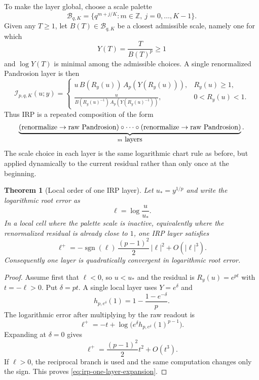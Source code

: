 \documentclass[10pt,a4paper]{article}
\theoremstyle{plain}
\newtheorem{theorem}{Theorem}[section]
\theoremstyle{definition}
\theoremstyle{remark}
\begin{document}
To make the layer global, choose a scale palette
\[
  \mathcal B_{q,K}=\{q^{m+j/K}:m\in\mathbb Z,\ j=0,\ldots,K-1\}.
\]
Given any $T\ge1$, let $B(T)\in\mathcal B_{q,K}$ be a closest admissible scale,
namely one for which
\[
  Y(T)=\frac{T}{B(T)^p}\ge1
\]
and $\log Y(T)$ is minimal among the admissible choices.  A single
renormalized Pandrosion layer is then
\begin{equation}
  \mathcal I_{p,q,K}(u;y)=
  \begin{cases}
    u\,B(R_y(u))\,A_p(Y(R_y(u))), & R_y(u)\ge1,\\[0.4em]
    \displaystyle \frac{u}{B(R_y(u)^{-1})\,A_p(Y(R_y(u)^{-1}))}, & 0<R_y(u)<1.
  \end{cases}
  \label{eq:irp-layer}
\end{equation}
Thus IRP is a repeated composition of the form
\[
  \underbrace{(\hbox{renormalize}\to\hbox{raw Pandrosion})\circ\cdots\circ
  (\hbox{renormalize}\to\hbox{raw Pandrosion})}_{m\ \hbox{layers}}.
\]
The scale choice in each layer is the same logarithmic chart rule as before,
but applied dynamically to the current residual rather than only once at the
beginning.

\begin{theorem}[Local order of one IRP layer]
\label{thm:irp-one-layer}
Let $u_*=y^{1/p}$ and write the logarithmic root error as
\[
  \ell=\log\frac{u}{u_*}.
\]
In a local cell where the palette scale is inactive, equivalently where the
renormalized residual is already close to $1$, one IRP layer satisfies
\begin{equation}
  \ell^+
  =-\operatorname{sgn}(\ell)\,\frac{(p-1)^2}{2}\,|\ell|^2
   +O(|\ell|^3).
  \label{eq:irp-one-layer-expansion}
\end{equation}
Consequently one layer is quadratically convergent in logarithmic root error.
\end{theorem}

\begin{proof}
Assume first that $\ell<0$, so $u<u_*$ and the residual is
$R_y(u)=e^{pt}$ with $t=-\ell>0$.  Put $\delta=pt$.  A single local layer uses
$Y=e^\delta$ and
\[
  h_{p,e^\delta}(1)=1-\frac{1-e^{-\delta}}{p}.
\]
The logarithmic error after multiplying by the raw readout is
\[
  \ell^+
  =-t+\log\Big(e^\delta h_{p,e^\delta}(1)^{p-1}\Big).
\]
Expanding at $\delta=0$ gives
\[
  \ell^+=\frac{(p-1)^2}{2}t^2+O(t^3).
\]
If $\ell>0$, the reciprocal branch is used and the same computation changes
only the sign.  This proves \eqref{eq:irp-one-layer-expansion}.
\end{proof}
\end{document}
